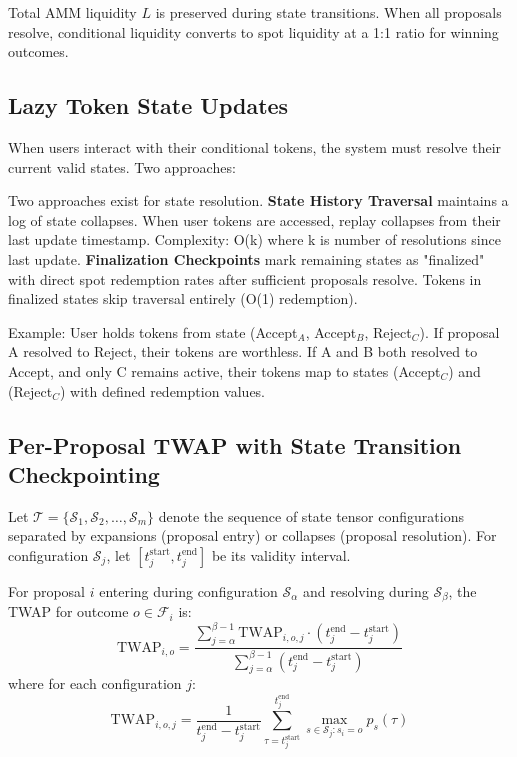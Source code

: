 \documentclass{article}
\begin{document}
Total AMM liquidity $L$ is preserved during state transitions. When all proposals resolve, conditional liquidity converts to spot liquidity at a 1:1 ratio for winning outcomes.

\subsection{Lazy Token State Updates}
When users interact with their conditional tokens, the system must resolve their current valid states. Two approaches:


Two approaches exist for state resolution. \textbf{State History Traversal} maintains a log of state collapses. When user tokens are accessed, replay collapses from their last update timestamp. Complexity: O(k) where k is number of resolutions since last update. \textbf{Finalization Checkpoints} mark remaining states as "finalized" with direct spot redemption rates after sufficient proposals resolve. Tokens in finalized states skip traversal entirely (O(1) redemption).

Example: User holds tokens from state (Accept$_A$, Accept$_B$, Reject$_C$). If proposal A resolved to Reject, their tokens are worthless. If A and B both resolved to Accept, and only C remains active, their tokens map to states (Accept$_C$) and (Reject$_C$) with defined redemption values.

\subsection{Per-Proposal TWAP with State Transition Checkpointing}
Let $\mathcal{T} = \{\mathcal{S}_1, \mathcal{S}_2, \ldots, \mathcal{S}_m\}$ denote the sequence of state tensor configurations separated by expansions (proposal entry) or collapses (proposal resolution). For configuration $\mathcal{S}_j$, let $[t_j^{\text{start}}, t_j^{\text{end}}]$ be its validity interval.
        
        For proposal $i$ entering during configuration $\mathcal{S}_{\alpha}$ and resolving during $\mathcal{S}_{\beta}$, the TWAP for outcome $o \in \mathcal{F}_i$ is:
        \begin{equation}
        \text{TWAP}_{i,o} = \frac{\sum_{j=\alpha}^{\beta-1} \text{TWAP}_{i,o,j} \cdot (t_j^{\text{end}} - t_j^{\text{start}})}{\sum_{j=\alpha}^{\beta-1} (t_j^{\text{end}} - t_j^{\text{start}})}
        \end{equation}
        where for each configuration $j$:
        \begin{equation}
        \text{TWAP}_{i,o,j} = \frac{1}{t_j^{\text{end}} - t_j^{\text{start}}} \sum_{\tau=t_j^{\text{start}}}^{t_j^{\text{end}}} \max_{s \in \mathcal{S}_j : s_i = o} p_s(\tau)
        \end{equation}
        
\end{document}
